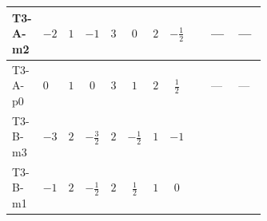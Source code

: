 \documentclass[8pt]{article}
\begin{document}
\begin{landscape}
\begin{longtable}{@{}llcccccc >{\raggedright\arraybackslash}p{0.21\linewidth} >{\raggedright\arraybackslash}p{0.21\linewidth} >{\raggedright\arraybackslash}p{0.21\linewidth}@{}}
\midrule
T3-A-m2 & $-2$ & $1$ & $-1$ & $3$ & $0$ & $2$ & $-\frac{1}{2}$ & \scriptsize\adjustbox{max width=\linewidth}{$\begin{gathered} +4 {\lambda_{HS_1}^{(1)}} {\lambda_{S_1}^{(1)}}\end{gathered}$} & --- & --- \\
\midrule
T3-A-p0 & $0$ & $1$ & $0$ & $3$ & $1$ & $2$ & $\frac{1}{2}$ & \scriptsize\adjustbox{max width=\linewidth}{$\begin{gathered} +4 {\lambda_{HS_1}^{(1)}} {\lambda_{S_1}^{(1)}}\end{gathered}$} & --- & --- \\
\midrule
T3-B-m3 & $-3$ & $2$ & $-\frac{3}{2}$ & $2$ & $-\frac{1}{2}$ & $1$ & $-1$ & \scriptsize\adjustbox{max width=\linewidth}{$\begin{gathered} +6 {\lambda_{HS_1}^{(1)}} {\lambda_{S_1}^{(1)}}\end{gathered}$} & \scriptsize\adjustbox{max width=\linewidth}{$\begin{gathered} {\lambda_{HS_1}^{(1)}} (2 T_{\nu}^{(1)}+6 \operatorname{Tr}\!\left({Y_d}\,\left({Y_d}\right)^{\dagger}\right)+2 \operatorname{Tr}\!\left({Y_e}\,\left({Y_e}\right)^{\dagger}\right)+6 \operatorname{Tr}\!\left({Y_u}\,\left({Y_u}\right)^{\dagger}\right))\end{gathered}$} & \scriptsize\adjustbox{max width=\linewidth}{$\begin{gathered} +\frac{9 {g_2}^4}{4}\end{gathered}$} \\
\midrule
T3-B-m1 & $-1$ & $2$ & $-\frac{1}{2}$ & $2$ & $\frac{1}{2}$ & $1$ & $0$ & \scriptsize\adjustbox{max width=\linewidth}{$\begin{gathered} +6 {\lambda_{HS_1}^{(1)}} {\lambda_{S_1}^{(1)}}\end{gathered}$} & \scriptsize\adjustbox{max width=\linewidth}{$\begin{gathered} {\lambda_{HS_1}^{(1)}} (2 T_{\nu}^{(1)}+6 \operatorname{Tr}\!\left({Y_d}\,\left({Y_d}\right)^{\dagger}\right)+2 \operatorname{Tr}\!\left({Y_e}\,\left({Y_e}\right)^{\dagger}\right)+6 \operatorname{Tr}\!\left({Y_u}\,\left({Y_u}\right)^{\dagger}\right))\end{gathered}$} & \scriptsize\adjustbox{max width=\linewidth}{$\begin{gathered} +\frac{9 {g_2}^4}{4}\end{gathered}$} \\
\midrule

\end{longtable}
\end{landscape}
\end{document}
